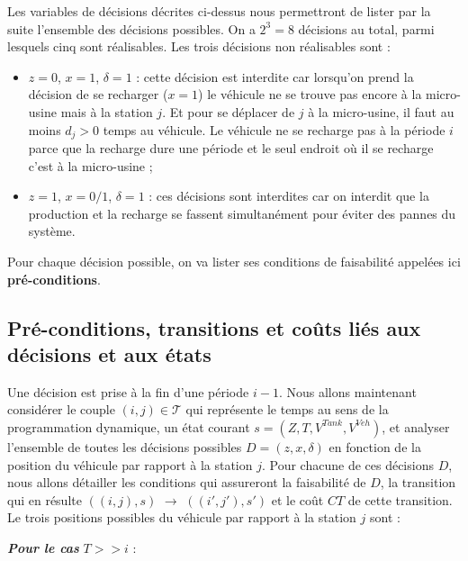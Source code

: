 Les variables de décisions décrites ci-dessus nous permettront de lister par la suite l'ensemble des décisions possibles. On a $2^3=8$ décisions au total, parmi lesquels cinq sont réalisables. Les trois décisions non réalisables sont :
\begin{itemize}[label=$\square$]
	\item $z=0$, $x=1$, $\delta=1$ : cette décision est interdite car lorsqu'on prend la décision de se recharger ($x=1$) le véhicule ne se trouve pas encore à la micro-usine mais à la station $j$. Et pour se déplacer de $j$ à la micro-usine, il faut au moins $d_j>0$ temps au véhicule. Le véhicule ne se recharge pas à la période $i$ parce que la recharge dure une période et le seul endroit où il se recharge c'est à la micro-usine ;
	\item $z=1$, $x=0/1$, $\delta=1$ : ces décisions sont interdites car on interdit que la production et la recharge se fassent simultanément pour éviter des pannes du système.
\end{itemize}	
Pour chaque décision possible, on va lister ses conditions de faisabilité appelées ici \textbf{pré-conditions}.
\subsection{ Pré-conditions, transitions et coûts liés aux décisions et aux états}
\label{liste_decisons}
Une décision est prise à la fin d'une période $i - 1$. Nous allons maintenant considérer le couple $(i, j) \in \mathcal{T}$ qui représente le temps au sens de la programmation dynamique, un état courant $s = (Z, T, V^{Tank}, V^{Veh})$, et analyser l'ensemble de toutes les décisions possibles $D = (z, x, \delta)$ en fonction de la position du véhicule par rapport à la station $j$. Pour chacune de ces décisions $D$, nous allons détailler les conditions qui assureront la faisabilité de $D$, la transition qui en résulte $((i, j), s)$ $\rightarrow$ $((i', j'), s')$ et le coût $CT$ de cette transition. Le trois positions possibles du véhicule par rapport à la station $j$ sont :



\textit{\textbf{Pour le cas}} $T>>i$ :

